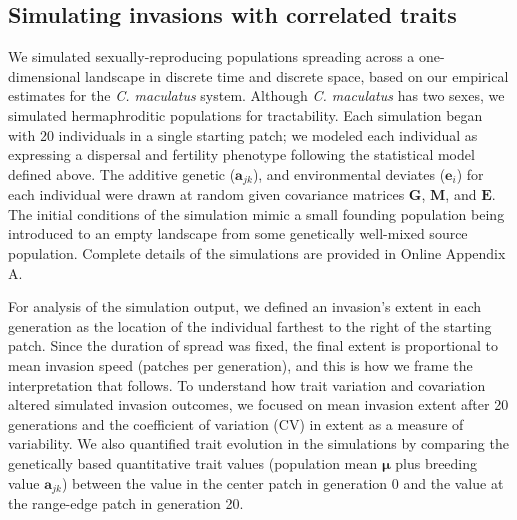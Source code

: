 \documentclass[11pt]{article}
\newcommand{\revise}[1]{{\color{Mahogany}{#1}}}
\begin{document}
\subsection*{Simulating invasions with correlated traits}
We simulated sexually-reproducing populations spreading across a one-dimensional landscape in discrete time and discrete space, based on our empirical estimates for the \textit{C. maculatus} system.
Although \textit{C. maculatus} has two sexes, we simulated hermaphroditic populations for tractability.
Each simulation began with 20 individuals in a single starting patch; we modeled each individual as expressing a dispersal and fertility phenotype following the statistical model defined above.
The additive genetic ($\bm{a}_{jk}$), \revise{maternal ($\bm{m}_{k}$),} and environmental deviates ($\bm{e}_i$) for each individual were drawn at random given covariance matrices $\bm{G}$, $\bm{M}$, and $\bm{E}$.
The initial conditions of the simulation mimic a small founding population being introduced to an empty landscape from some genetically well-mixed source population.
Complete details of the simulations are provided in Online Appendix A.

For analysis of the simulation output, we defined an invasion's extent in each generation as the location of the individual farthest to the right of the starting patch.
Since the duration of spread was fixed, the final extent is proportional to mean invasion speed (patches per generation), and this is how we frame the interpretation that follows.
To understand how trait variation and covariation altered simulated invasion outcomes, we focused on mean invasion extent after 20 generations and the coefficient of variation (CV) in extent as a measure of variability.
We also quantified trait evolution in the simulations by comparing the genetically based quantitative trait values (population mean $\bm{\mu}$ plus breeding value $\bm{a}_{jk}$) between the value in the center patch in generation 0 and the value at the range-edge patch in generation 20.
\end{document}

